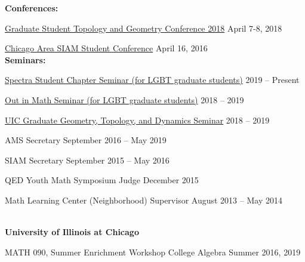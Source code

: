 \begin{singlespace}
{\bf Conferences:}

\href{https://www.math.uic.edu/gstgc2018/}{Graduate Student Topology and Geometry Conference 2018}	 \hfill 
{April 7-8, 2018}


\href{https://sites.google.com/a/uic.edu/chicago-area-siam-student-conference-2016/home}{Chicago Area SIAM Student Conference}	 \hfill  {April 16, 2016} \\

{\bf Seminars:}

 
 \href{}{Spectra Student Chapter Seminar (for LGBT graduate students)} \hfill {2019 -- Present}

 \href{}{Out in Math Seminar (for LGBT graduate students)} \hfill {2018 -- 2019}
 
 \href{}{UIC Graduate Geometry, Topology, and Dynamics Seminar}	 \hfill  {2018 -- 2019} \\


\vfill

\vspace{5pt}
\hspace{-12pt}{\color{sectiontitles}{\large Service}}
\vspace{10pt}


{AMS Secretary} \hfill {September 2016 -- May 2019} \\
\indent {} 

{SIAM Secretary} \hfill {September 2015 -- May 2016} \\
\indent {} 

{QED Youth Math Symposium Judge} \hfill {December 2015} \\
\indent {}

{Math Learning Center (Neighborhood) Supervisor} \hfill {August 2013 -- May 2014}\\
\indent {} \\

\vfill

\vspace{5pt}
\hspace{-12pt}{\color{sectiontitles}{\large Teaching}}
\vspace{10pt}


{\bf University of Illinois at Chicago} \\

MATH 090, Summer Enrichment Workshop College Algebra \hfill Summer 2016, 2019


\end{singlespace}
